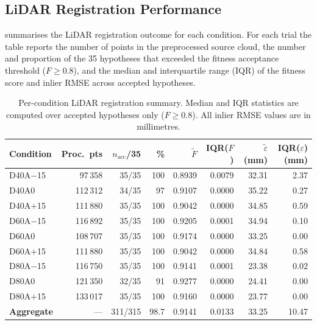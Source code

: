 \subsection{LiDAR Registration Performance}
\label{subsec:pa-results-lidar-summary}

 summarises the LiDAR registration outcome for each condition. For each trial the table reports the number of points in the preprocessed source cloud, the number and proportion of the 35 hypotheses that exceeded the fitness acceptance threshold ($F \geq 0.8$), and the median and interquartile range (IQR) of the fitness score and inlier RMSE across accepted hypotheses.

\begin{table}[htbp]
  \centering
  \small
  \setlength{\tabcolsep}{4pt}
  \caption{Per-condition LiDAR registration summary. Median and IQR statistics are computed over accepted hypotheses only ($F \geq 0.8$). All inlier RMSE values are in millimetres.}
  \label{tab:pa-results-lidar-per-condition}
  \begin{tabular}{@{} l r r r r r r r @{}}
    \toprule
    \textbf{Condition} &
    \textbf{Proc.\ pts} &
    \boldmath$n_\text{acc}$\textbf{/35} &
    \textbf{\%} &
    \boldmath$\tilde{F}$ &
    \textbf{IQR(}\boldmath$F$\textbf{)} &
    \boldmath$\tilde{\varepsilon}$ \textbf{(mm)} &
    \textbf{IQR(}\boldmath$\varepsilon$\textbf{) (mm)} \\
    \midrule
    D40A$-$15 &  97\,358 & 35/35 & 100 & 0.8939 & 0.0079 & 32.31 & 2.37 \\
    D40A0     & 112\,312 & 34/35 &  97 & 0.9107 & 0.0000 & 35.22 & 0.27 \\
    D40A$+$15 & 111\,880 & 35/35 & 100 & 0.9042 & 0.0000 & 34.85 & 0.59 \\
    D60A$-$15 & 116\,892 & 35/35 & 100 & 0.9205 & 0.0001 & 34.94 & 0.10 \\
    D60A0     & 108\,707 & 35/35 & 100 & 0.9174 & 0.0000 & 33.25 & 0.00 \\
    D60A$+$15 & 111\,880 & 35/35 & 100 & 0.9042 & 0.0000 & 34.84 & 0.58 \\
    D80A$-$15 & 116\,750 & 35/35 & 100 & 0.9141 & 0.0001 & 23.38 & 0.02 \\
    D80A0     & 121\,350 & 32/35 &  91 & 0.9277 & 0.0000 & 24.41 & 0.00 \\
    D80A$+$15 & 133\,017 & 35/35 & 100 & 0.9160 & 0.0000 & 23.77 & 0.00 \\
    \midrule
    \textbf{Aggregate} & --- & 311/315 & 98.7 & 0.9141 & 0.0133 & 33.25 & 10.47 \\
    \bottomrule
  \end{tabular}
\end{table}

